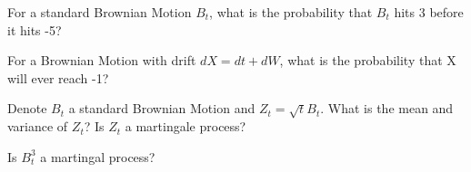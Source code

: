 \begin{exe}
For a standard Brownian Motion $B_t$, what is the probability that $B_t$ hits 3 before it hits -5?
\end{exe}
\begin{teacher}
\begin{sol}
\end{sol}
\end{teacher}

\begin{exe}
For a Brownian Motion with drift $dX = dt + dW$, what is the probability that X will ever reach -1?
\end{exe}
\begin{teacher}
\begin{sol}
\end{sol}
\end{teacher}

\begin{exe}
Denote $B_t$ a standard Brownian Motion and $Z_t=\sqrt{t}B_t$. What is the mean and variance of $Z_t$? Is $Z_t$ a martingale process?
\end{exe}
\begin{teacher}
\begin{sol}
\end{sol}
\end{teacher}

\begin{exe}
Is $B_t^3$ a martingal process?
\end{exe}
\begin{teacher}
\begin{sol}
\end{sol}
\end{teacher}




















